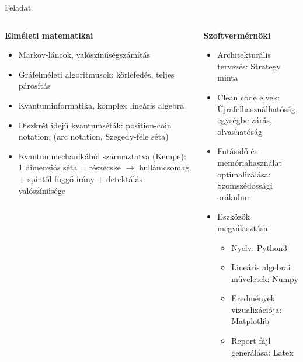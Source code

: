 \documentclass[aspectratio=169]{beamer}
\begin{document}
\begin{frame}{Feladat}

\begin{columns}[t,onlytextwidth]
    \begin{column}{.5\textwidth}
      \begin{center}
        \textbf{Elméleti matematikai}
      \end{center}
      \begin{itemize}
          \item Markov-láncok, valószínűségszámítás
          \item Gráfelméleti algoritmusok: körlefedés, teljes párosítás
          \item Kvantuminformatika, komplex lineáris algebra
          \item Diszkrét idejű kvantumséták: position-coin notation, (arc notation, Szegedy-féle séta)
          \item Kvantummechanikából származtatva (Kempe): 1 dimenziós séta = részecske $\rightarrow$ hullámcsomag + spintől függő irány + detektálás valószínűsége
      \end{itemize}
    \end{column}
    \begin{column}{.5\textwidth}
      \begin{center}
         \textbf{Szoftvermérnöki}
      \end{center}
      \begin{itemize}
          \item Architekturális tervezés: Strategy minta
          \item Clean code elvek: Újrafelhasználhatóság, egységbe zárás, olvashatóság
          \item Futásidő és memóriahasználat optimalizálása: Szomszédossági orákulum
          \item Eszközök megválasztása:
          \begin{itemize}
            \item Nyelv: Python3
            \item Lineáris algebrai műveletek: Numpy
            \item Eredmények vizualizációja: Matplotlib
            \item Report fájl generálása: Latex
          \end{itemize}
      \end{itemize}
    \end{column}
  \end{columns}
\end{frame}
\end{document}
